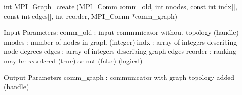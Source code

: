 int MPI_Graph_create
   (MPI_Comm comm_old, int nnodes, const int indx[],
    const int edges[], int reorder,
    MPI_Comm *comm_graph)

Input Parameters:
comm_old : input communicator without topology (handle)
nnodes : number of nodes in graph (integer)
indx : array of integers describing node degrees
edges : array of integers describing graph edges
reorder : ranking may be reordered (true) or not (false) (logical)

Output Parameters
comm_graph : communicator with graph topology added (handle)
